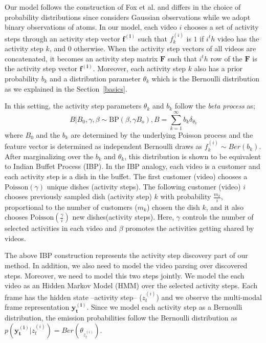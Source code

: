 Our model follows the construction of Fox et al.\cite{foxBPHMM} and differs in the choice of probability distributions since \cite{foxBPHMM} considers Gaussian observations while we adopt binary observations of atoms. In our model, each video $i$ chooses a set of activity steps through an activity step vector $\mathbf{f^{(i)}}$ such that $f^{(i)}_k$ is $1$ if $i^th$ video has the activity step $k$, and 0 otherwise. When the activity step vectors of all videos are concatenated, it becomes an activity step matrix $\mathbf{F}$ such that $i^th$ row of the $\mathbf{F}$ is the activity step vector $\mathbf{f^{(i)}}$. Moreover, each activity step $k$ also has a prior probability $b_k$  and a distribution parameter $\theta_k$ which is the Bernoulli distribution as we explained in the Section~\ref{basics}.

In this setting, the activity step parameters $\theta_k$ and $b_k$ follow the \emph{beta process} as;
\begin{equation}
  B|B_0,\gamma,\beta \sim \text{BP}(\beta,\gamma B_o), B=\sum_{k=1}^\infty b_k \delta_{\theta_k}
\end{equation}
where $B_0$ and the $b_k$ are determined by the underlying Poisson process \cite{ibp} and the feature vector is determined as independent Bernoulli draws as $f_{k}^{(i)} \sim Ber(b_k)$. After marginalizing over the $b_k$ and $\theta_k$, this distribution is shown to be equivalent to Indian Buffet Process (IBP)\cite{ibp}. In the IBP analogy, each video is a customer and each activity step is a dish in the buffet. The first customer (video) chooses a $\text{Poisson}(\gamma)$ unique dishes (activity steps). The following customer (video) $i$ chooses previously sampled dish (activity step) $k$ with probability $\frac{m_k}{i}$,  proportional to the number of customers ($m_k$) chosen the dish $k$, and it also chooses $\text{Poisson}(\frac{\gamma}{i})$ new dishes(activity steps). Here, $\gamma$ controls the number of selected activities in each video and $\beta$ promotes the activities getting shared by videos.

The above IBP construction represents the activity step discovery part of our method. In addition, we also need to model the video parsing over discovered steps. Moreover, we need to model this two steps jointly. We model the each video as an Hidden Markov Model (HMM) over the selected activity steps. Each frame has the hidden state --activity step-- ($z^{(i)}_t$) and we observe the multi-modal frame representation $\mathbf{y^{(i)}_t}$. Since we model each activity step as a Bernoulli distribution, the emission probabilities follow the Bernoulli distribution as $p(\mathbf{y^{(i)}_t}|z^{(i)}_t)=Ber(\theta_{z^{(i)}_t})$.

